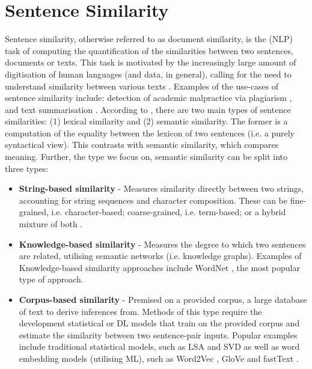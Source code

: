 \documentclass[10pt,oneside]{report}
\begin{document}
\section{Sentence Similarity}\label{sec:sentenceSimilarity}
Sentence similarity, otherwise referred to as document similarity, is the (NLP) task of computing the quantification of the similarities between two sentences, documents or texts. This task is motivated by the increasingly large amount of digitisation of human languages (and data, in general), calling for the need to understand similarity between various texts \cite{raju2022sentence}. Examples of the use-cases of sentence similarity include: detection of academic malpractice via plagiarism \cite{lukashenko2007computer, baba2017plagiarism}, and text summarisation \cite {aliguliyev2009new, kumar2020semantic, jo2017k}. According to \cite{raju2022sentence}, there are two main types of sentence similarities: (1) lexical similarity and (2) semantic similarity. The former is a computation of the equality between the lexicon of two sentences (i.e. a purely syntactical view). This contrasts with semantic similarity, which compares meaning. Further, the type we focus on, semantic similarity can be split into three types: 

\begin{itemize}
    \item \textbf{String-based similarity} - Measures similarity directly between two strings, accounting for string sequences and character composition. These can be fine-grained, i.e. character-based; coarse-grained, i.e. term-based; or a hybrid mixture of both \cite{yu2016string}.
    \item \textbf{Knowledge-based similarity} - Measures the degree to which two sentences are related, utilising semantic networks (i.e. knowledge graphs). Examples of Knowledge-based similarity approaches include WordNet \cite{budanitsky2001semantic}, the most popular type of approach.
    \item \textbf{Corpus-based similarity} - Premised on a provided corpus, a large database of text to derive inferences from. Methods of this type require the development statistical or DL models that train on the provided corpus and estimate the similarity between two sentence-pair inputs. Popular examples include traditional statistical models, such as LSA \cite{landauer1998introduction} and SVD \cite{steinberger2005text} as well as word embedding models (utilising ML), such as Word2Vec \cite{bojanowski2017enriching}, GloVe \cite{pennington2014glove} and fastText \cite{mikolov2013efficient}.
\end{itemize}
\end{document}
